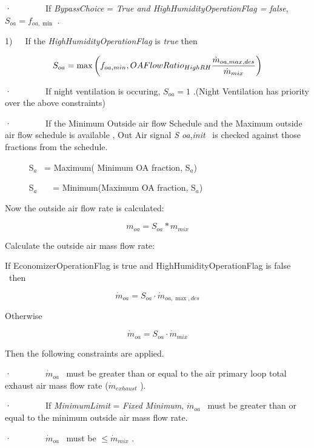 ·~~~~~~~~If \emph{BypassChoice} = \emph{True and HighHumidityOperationFlag = false}, \({S_{oa}} = {f_{oa,\min }}\) .

1)~~~If the \emph{HighHumidityOperationFlag} is \emph{true} then

\begin{equation}
  S_{oa} = \max\PB{f_{oa,min},OAFlowRatio_{HighRH}\frac{\dot{m}_{oa,max,des}}{\dot{m}_{mix}}}
\end{equation}

·~~~~~~~~If night ventilation is occuring, \({S_{oa}} = 1\) .(Night Ventilation has priority over the above constraints)

·~~~~~~~~If the Minimum Outside air flow Schedule and the Maximum outside air flow schedule is available , Out Air signal \emph{S oa},\emph{init} ~is checked against those fractions from the schedule.

~~~~~ S\(_{a}\)~ = Maximum( Minimum OA fraction, S\(_{a}\))

~~~~~ S\(_{a}\)~~~ = Minimum(Maximum OA fraction, S\(_{a}\))

Now the outside air flow rate is calculated:

\begin{equation}
{m_{oa}} = {S_{oa}}*{m_{mix}}
\end{equation}

Calculate the outside air mass flow rate:

If EconomizerOperationFlag is true and HighHumidityOperationFlag is false ~then

\begin{equation}
{\dot m_{oa}} = {S_{oa}}\cdot {\dot m_{oa,\max ,des}}
\end{equation}

Otherwise

\begin{equation}
{\dot m_{oa}} = {S_{oa}}\cdot {\dot m_{mix}}
\end{equation}

Then the following constraints are applied.

·~~~~~~~~\({\dot m_{oa}}\) ~must be greater than or equal to the air primary loop total exhaust air mass flow rate (\({\dot m_{exhaust}}\) ).

·~~~~~~~~If \emph{MinimumLimit} = \emph{Fixed Minimum}, \({\dot m_{oa}}\) ~must be greater than or equal to the minimum outside air mass flow rate.

·~~~~~~~~\({\dot m_{oa}}\) ~must be \(\le {\dot m_{mix}}\) .

